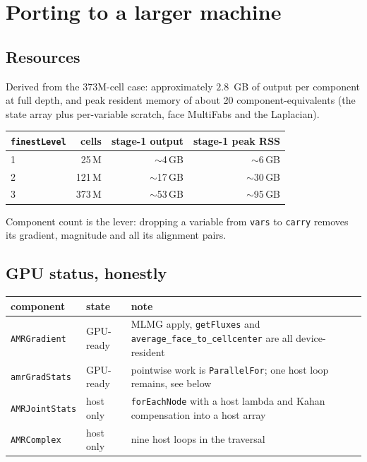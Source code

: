 \documentclass[11pt]{article}
\begin{document}
\section{Porting to a larger machine}
\label{sec:porting}

\subsection{Resources}

Derived from the $373$M-cell case: approximately $2.8$~GB of output per
component at full depth, and peak resident memory of about 20
component-equivalents (the state array plus per-variable scratch, face
MultiFabs and the Laplacian).

\begin{center}
\begin{tabular}{lrrr}
\toprule
\texttt{finestLevel} & cells & stage-1 output & stage-1 peak RSS \\
\midrule
1 & \phantom{0}25\,M & $\sim$4\,GB & $\sim$6\,GB \\
2 & 121\,M & $\sim$17\,GB & $\sim$30\,GB \\
3 & 373\,M & $\sim$53\,GB & $\sim$95\,GB \\
\bottomrule
\end{tabular}
\end{center}

Component count is the lever: dropping a variable from \texttt{vars} to
\texttt{carry} removes its gradient, magnitude and all its alignment pairs.

\subsection{GPU status, honestly}

\begin{center}
\begin{tabular}{llp{}}
\toprule
component & state & note \\
\midrule
\texttt{AMRGradient} & GPU-ready & MLMG apply, \texttt{getFluxes} and
  \texttt{average\_face\_to\_cellcenter} are all device-resident \\
\addlinespace[2pt]
\texttt{amrGradStats} & GPU-ready & pointwise work is \texttt{ParallelFor};
  one host loop remains, see below \\
\addlinespace[2pt]
\texttt{AMRJointStats} & host only & \texttt{forEachNode} with a host lambda
  and Kahan compensation into a host array \\
\addlinespace[2pt]
\texttt{AMRComplex} & host only & nine host loops in the traversal \\
\bottomrule
\end{tabular}
\end{center}
\end{document}
